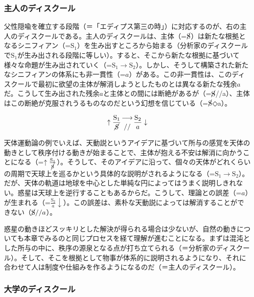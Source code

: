 \subsubsection{主人のディスクール}\label{ux4e3bux4ebaux306eux30c7ux30a3ux30b9ux30afux30fcux30eb}

父性隠喩を確立する段階（＝「エディプス第三の時」）に対応するのが、右の主人のディスクールである。主人のディスクールは、主体（=\(\cancel{\textrm{S}}\)）は新たな根拠となるシニフィアン（=\(\textrm{S}_1\)）を生み出すところから始まる（分析家のディスクールで\(\textrm{S}_1\)が生み出される段階に等しい）。すると、そこから新たな根拠に基づいて様々な命題が生み出されていく（=\(\textrm{S}_1\rightarrow\textrm{S}_2\)）。しかし、そうして構築された新たなシニフィアンの体系にも非一貫性（=\(a\)）がある。この非一貫性は、このディスクールで最初に欲望の主体が解消しようとしたものとは異なる新たな残余\(a\)だ。こうして生み出された残余\(a\)と主体との間には断絶があるが（=\(\cancel{\textrm{S}}\)//a）、主体はこの断絶が克服されうるものなのだという幻想を信じている（=\(\cancel{\textrm{S}}\)◇a）。

\[
\uparrow\frac{\mathrm{S_1}}{\mathrm{\cancel{S}}}\genfrac{}{}{0pt}{}{\longrightarrow}{//}\frac{\mathrm{S_2}}{a}\downarrow
\]

天体運動論の例でいえば、天動説というアイデアに基づいて所与の感覚を天体の動きとして秩序付ける動きが始まることで、主体が抱える不安は解消に向かうことになる（=\(\uparrow\frac{\textrm{S}_1}{\cancel{\textrm{S}}}\)）。そうして、そのアイデアに沿って、個々の天体がどれくらいの周期で天球上を巡るかという具体的な説明がされるようになる（=\(\textrm{S}_1\rightarrow\textrm{S}_2\)）。だが、天体の軌道は地球を中心とした単純な円によってはうまく説明しきれない。惑星は天球上を逆行することもあるからだ。こうして、理論との誤差（=\(a\)）が生まれる（=\(\frac{\textrm{S}_2}{a}\downarrow\)）。この誤差は、素朴な天動説によっては解消することができない（\(\cancel{\textrm{S}}//a\)）。

惑星の動きほどスッキリとした解決が得られる場合は少ないが、自然の動きについても本章でみるのと同じプロセスを経て理解が進むことになる。まずは混沌とした所与の中に、秩序の源泉となる点が打ち立てられる（＝分析家のディスクール）。そして、そこを根拠として物事が体系的に説明されるようになり、それに合わせて人は制度や仕組みを作るようになるのだ（＝主人のディスクール）。

\subsubsection{大学のディスクール}\label{ux5927ux5b66ux306eux30c7ux30a3ux30b9ux30afux30fcux30eb}

